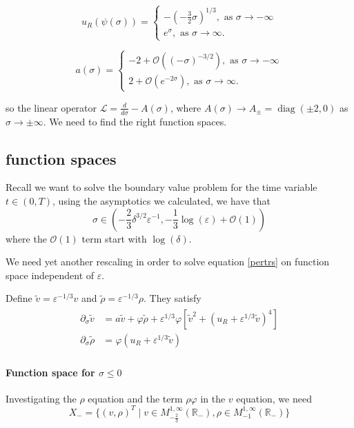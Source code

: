 \documentclass[letterpaper,11pt]{article}
\newcommand{\R}{\mathbb{R}}
\newcommand{\rmO}{\mathcal{O}}
\newcommand{\eps}{\varepsilon}
\newcommand{\diag}{\operatorname{diag}}
\numberwithin{equation}{section}
\theoremstyle{plain}
\begin{document}
\begin{equation}
u_R(\psi(\sigma)) =\begin{cases}
 -(-\frac{3}{2}\sigma)^{1/3}, \text{ as }\sigma \to -\infty\\
e^{\sigma} , \text{ as }\sigma \to \infty.
\end{cases}
\end{equation}

\begin{equation}
a(\sigma) =\begin{cases}
-2+ \rmO((-\sigma)^{-3/2}), \text{ as }\sigma \to -\infty\\
2+ \rmO(e^{-2\sigma}), \text{ as }\sigma \to \infty.
\end{cases}
\end{equation}

so the linear operator $\mathcal{L} = \frac{d}{d\sigma} - A(\sigma)$, where $A(\sigma) \to A_\pm = \diag(\pm 2, 0)$ as $\sigma \to \pm \infty$. We need to find the right function spaces.


\subsection{function spaces}

Recall we want to solve the boundary value problem for the time variable $t \in (0,T)$, using the asymptotics we calculated, we have that 
\[
\sigma \in \left(-\frac{2}{3}\delta^{3/2}\eps^{-1}, -\frac{1}{3}\log(\eps) + \rmO(1) \right)
\]
where the $\rmO(1)$ term start with $\log(\delta)$.

We need yet another rescaling in order to solve equation  \eqref{pertrs} on function space independent of $\eps$.

Define $\tilde{v} = \eps^{-1/3}v$ and $\tilde{\rho} = \eps^{-1/3}\rho$. They satisfy
\begin{align} \label{pertrrs}
\begin{split}
\partial_\sigma \tilde{v} &= a \tilde{v}  + \varphi \tilde{\rho}  +\eps^{1/3}\varphi [\tilde{v}^2 + (u_R+\eps^{1/3}\tilde{v})^4] \\
\partial_\sigma \tilde{\rho} &=  \varphi(u_R+\eps^{1/3}\tilde{v})
\end{split}
\end{align}

\paragraph{Function space for $\sigma \le 0$}
Investigating the $\rho$ equation and the term $\rho \varphi$ in the $v$ equation, we need
\[
X_- = \{ (v,\rho)^T \mid v \in M_{-\frac{2}{3}}^{1,\infty} (\R_-) , \rho \in M_{-1}^{1,\infty}(\R_-)\}
\]
\end{document}
